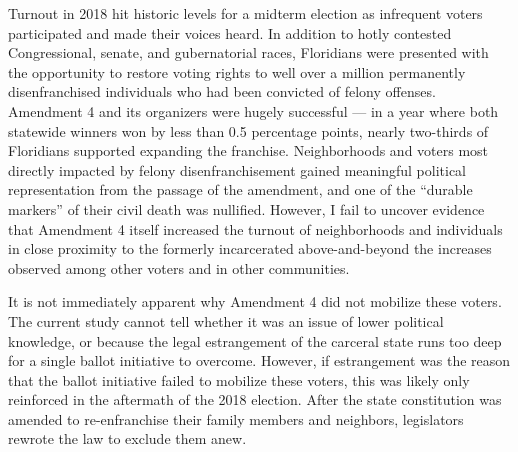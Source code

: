 \documentclass[
  12pt,
]{article}
\begin{document}
Turnout in 2018 hit historic levels for a midterm election as infrequent voters participated and made their voices heard. In addition to hotly contested Congressional, senate, and gubernatorial races, Floridians were presented with the opportunity to restore voting rights to well over a million permanently disenfranchised individuals who had been convicted of felony offenses. Amendment 4 and its organizers were hugely successful --- in a year where both statewide winners won by less than 0.5 percentage points, nearly two-thirds of Floridians supported expanding the franchise. Neighborhoods and voters most directly impacted by felony disenfranchisement gained meaningful political representation from the passage of the amendment, and one of the ``durable markers'' of their civil death was nullified. However, I fail to uncover evidence that Amendment 4 itself increased the turnout of neighborhoods and individuals in close proximity to the formerly incarcerated above-and-beyond the increases observed among other voters and in other communities.

It is not immediately apparent why Amendment 4 did not mobilize these voters. The current study cannot tell whether it was an issue of lower political knowledge, or because the legal estrangement of the carceral state runs too deep for a single ballot initiative to overcome. However, if estrangement was the reason that the ballot initiative failed to mobilize these voters, this was likely only reinforced in the aftermath of the 2018 election. After the state constitution was amended to re-enfranchise their family members and neighbors, legislators rewrote the law to exclude them anew.
\end{document}
